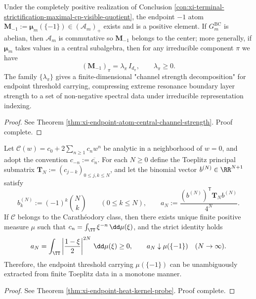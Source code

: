 \begin{conclusion}\label{con:xi-terminal-endpoint-atom-channel-strength-spectrum}
Under the completely positive realization of Conclusion \ref{con:xi-terminal-strictification-maximal-cp-visible-quotient}, the endpoint \(-1\) atom
\(
\mathbf{M}_{-1}:=\boldsymbol\mu_m(\{-1\})\in(\mathcal{A}_m)_+
\)
exists and is a positive element.
If \(G^{\mathrm{BC}}_m\) is abelian, then \(\mathcal{A}_m\) is commutative so \(\mathbf{M}_{-1}\) belongs to the center;
more generally, if \(\boldsymbol\mu_m\) takes values in a central subalgebra, then for any irreducible component \(\pi\) we have
\[
(\mathbf{M}_{-1})_\pi=\lambda_\pi\,I_{d_\pi},
\qquad
\lambda_\pi\ge 0.
\]
The family \(\{\lambda_\pi\}\) gives a finite-dimensional "channel strength decomposition" for endpoint threshold carrying, compressing extreme resonance boundary layer strength to a set of non-negative spectral data under irreducible representation indexing.
\end{conclusion}
\begin{proof}[Proof]
See Theorem \ref{thm:xi-endpoint-atom-central-channel-strength}. Proof complete.
\end{proof}

\begin{conclusion}\label{con:xi-terminal-endpoint-heat-kernel-probe-identity}
Let \(\mathscr{C}(w)=c_0+2\sum_{n\ge 1}c_n w^n\) be analytic in a neighborhood of \(w=0\), and adopt the convention \(c_{-n}:=\overline{c_n}\).
For each \(N\ge 0\) define the Toeplitz principal submatrix \(\mathbf{T}_N:=(c_{j-k})_{0\le j,k\le N}\), and let the binomial vector \(b^{(N)}\in\RR^{N+1}\) satisfy
\[
b^{(N)}_k:=(-1)^k\binom{N}{k}\qquad(0\le k\le N),
\qquad
a_N:=\frac{(b^{(N)})^{\mathsf T}\mathbf{T}_N b^{(N)}}{4^N}.
\]
If \(\mathscr{C}\) belongs to the Carathéodory class, then there exists unique finite positive measure \(\mu\) such that \(c_n=\int_{\TT}\xi^{-n}\,\dd\mu(\xi)\), and the strict identity holds
\[
a_N=\int_{\TT}\left|\frac{1-\xi}{2}\right|^{2N}\,\dd\mu(\xi)\ge 0,
\qquad
a_N\downarrow \mu(\{-1\})\quad(N\to\infty).
\]
Therefore, the endpoint threshold carrying \(\mu(\{-1\})\) can be unambiguously extracted from finite Toeplitz data in a monotone manner.
\end{conclusion}
\begin{proof}[Proof]
See Theorem \ref{thm:xi-endpoint-heat-kernel-probe}. Proof complete.
\end{proof}


